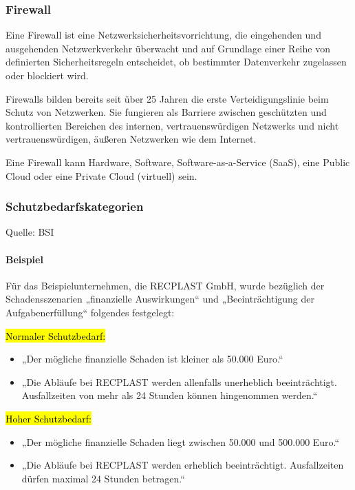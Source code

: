 \subsubsection{Firewall}
\label{sec:Firewall}


Eine Firewall ist eine Netzwerksicherheitsvorrichtung, die eingehenden und ausgehenden Netzwerkverkehr überwacht und auf Grundlage einer Reihe von definierten Sicherheitsregeln entscheidet, ob bestimmter Datenverkehr zugelassen oder blockiert wird.

Firewalls bilden bereits seit über 25 Jahren die erste Verteidigungslinie beim Schutz von Netzwerken. Sie fungieren als Barriere zwischen geschützten und kontrollierten Bereichen des internen, vertrauenswürdigen Netzwerks und nicht vertrauenswürdigen, äußeren Netzwerken wie dem Internet. 

Eine Firewall kann Hardware, Software, Software-as-a-Service (SaaS), eine Public Cloud oder eine Private Cloud (virtuell) sein.

\clearpage

\subsubsection{Schutzbedarfskategorien}
\label{sec:Schutzbedarf}

Quelle: BSI \cite{BSISchutzbedarf}

\paragraph{Beispiel} Für das Beispielunternehmen, die RECPLAST GmbH, wurde bezüglich der Schadensszenarien „finanzielle Auswirkungen“ und „Beeinträchtigung der Aufgabenerfüllung“ folgendes festgelegt:

{\hl{Normaler Schutzbedarf:}}

\begin{itemize}
	\item „Der mögliche finanzielle Schaden ist kleiner als 50.000 Euro.“
	\item „Die Abläufe bei RECPLAST werden allenfalls unerheblich beeinträchtigt. Ausfallzeiten von mehr als 24 Stunden können hingenommen werden.“
\end{itemize}

{\hl{Hoher Schutzbedarf:}}

\begin{itemize}
	\item „Der mögliche finanzielle Schaden liegt zwischen 50.000 und 500.000 Euro.“
	\item „Die Abläufe bei RECPLAST werden erheblich beeinträchtigt. Ausfallzeiten dürfen maximal 24 Stunden betragen.“
\end{itemize}

